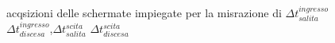 \begin{figure}[hb]
{	}
	\\
	
		\caption{acqsizioni delle schermate impiegate per la misrazione di $\Delta t_{salita}^{ingresso}$ $\Delta t_{discesa}^{ingresso}$,$\Delta t_{salita}^{scita}$ $\Delta t_{discesa}^{scita}$ }
		\label{f:sd}
	\end{figure}
